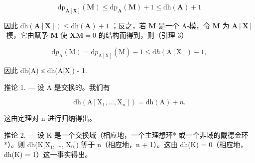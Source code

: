 \[
\mathrm{dp} _ {\mathbf {A} [ \mathbf {X} ]} (\mathbf {M}) \leqslant \mathrm{dp} _ {\mathbf {A}} (\mathbf {M}) + 1 \leqslant \mathrm{dh} (\mathbf {A}) + 1
\]

因此 \(\mathrm{dh}(\mathbf{A}[\mathbf{X}]) \leqslant \mathrm{dh}(\mathbf{A}) + 1\) ；反之，若 \(\mathbf{M}\) 是一个 A-模，令 \(\overline{\mathbf{M}}\) 为 \(\mathbf{A}[\mathbf{X}]\) -模，它由赋予 \(\mathbf{M}\) 使 \(\mathbf{X}\mathbf{M} = 0\) 的结构而得到，则（引理 3）

\[
\mathrm{d} p _ {\mathrm{A}} (\mathrm{M}) = \mathrm{d} p _ {\mathrm{A} [ \mathrm{X} ]} (\overline {{\mathrm{M}}}) - 1 \leqslant \mathrm{d} h (\mathrm{A} [ \mathrm{X} ]) - 1,
\]

因此 dh(A) ≤ dh(A{[}X{]}) - 1.

推论 1. --- 设 A 是交换的。我们有

\[
\mathrm{dh} (\mathrm{A} [ \mathrm{X} _ {1}, \dots , \mathrm{X} _ {n} ]) = \mathrm{dh} (\mathrm{A}) + n.
\]

这由定理对 n 进行归纳得出。

推论 2. --- 设 K 是一个交换域（相应地，一个主理想环* 或一个非域的戴德金环*）。则 dh(K{[}X₁, \ldots, Xₙ{]}) 等于 n（相应地，n + 1）。这由 dh(K) = 0（相应地，dh(K) = 1）这一事实得出。

